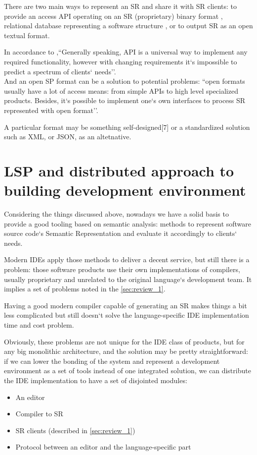 There are two main ways to represent an SR and share it with SR clients: to
provide an access API operating on an SR (proprietary) binary format \cite{Cannon, FreeSoftwareFoundation2016},
relational database representing a software structure \cite{Linton1983}, or to output SR as an
open textual format\cite{TheRustTeam2016}.

In accordance to \cite{Zouev2005},``Generally speaking, API is a universal way to implement any required
functionality, however with changing requirements it`s impossible to predict a
spectrum of clients` needs''.\\
And an open SP format can be a solution to potential problems: ``open formats
usually have a lot of access means: from simple APIs to high level specialized
products. Besides, it`s possible to implement one`s own interfaces to process SR
represented with open format''.

A particular format may be something self-designed[7] or a standardized
solution such as XML\cite{Germon}, or JSON\cite{ECMA-4042013}, as an altetnative.

\newpage
\section{LSP and distributed approach to building development
environment}
\label{sec:review_3}

Considering the things discussed above, nowadays we have a solid basis to
provide a good tooling based on semantic analysis: methods to represent
software source code`s Semantic Representation and evaluate it accordingly to
clients` needs.

Modern IDEs apply those methods to deliver a decent service, but still there is a
problem: those software products use their own implementations of compilers,
usually proprietary and unrelated to the original language`s development team.
It implies a set of problems noted in the \ref{sec:review_1}.

Having a good modern compiler capable of generating an SR makes things a bit
less complicated but still doesn`t solve the language-specific IDE
implementation time and cost problem.

Obviously, these problems are not unique for the IDE class of products, but for
any big monolithic architecture, and the solution may be pretty straightforward:
if we can lower the bonding of the system and represent a development
environment as a set of tools instead of one integrated solution, we can
distribute the IDE implementation to have a set of disjointed modules:
\begin{itemize}
    \item An editor
    \item Compiler to SR
    \item SR clients (described in \ref{sec:review_1})
    \item Protocol between an editor and the language-specific part
\end{itemize}

